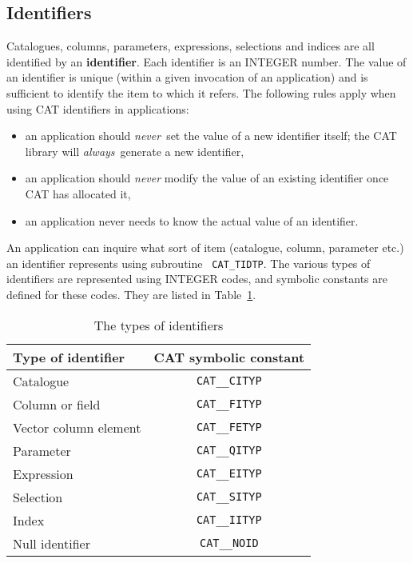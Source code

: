 \subsection{Identifiers}

Catalogues, columns, parameters, expressions, selections and indices are
all identified by an {\bf identifier}. Each identifier is an INTEGER
number. The value of an identifier is unique (within a given invocation of
an application) and is sufficient to identify the item to which it refers.
The following rules apply when using CAT identifiers in applications:

\begin{itemize}

  \item an application should {\it never}\, set the value of a new
   identifier itself; the CAT library will {\it always}\, generate a
   new identifier,

  \item an application should {\it never} modify the value of an
   existing identifier once CAT has allocated it,

  \item an application never needs to know the actual value of an
   identifier.

\end{itemize}

An application can inquire what sort of item (catalogue, column,
parameter etc.) an identifier represents using subroutine {\tt
CAT\_TIDTP}. The various types of identifiers are represented using
INTEGER codes, and symbolic constants are defined for these codes. They
are listed in Table~\ref{IDTYPE}.

\begin{table}[htbp]

\begin{center}
\begin{tabular}{lc}
Type of identifier        &  CAT symbolic constant \\ \hline
Catalogue                 &  {\tt CAT\_\_CITYP}   \\
Column or field           &  {\tt CAT\_\_FITYP}   \\
Vector column element     &  {\tt CAT\_\_FETYP}   \\
Parameter                 &  {\tt CAT\_\_QITYP}   \\
Expression                &  {\tt CAT\_\_EITYP}   \\
Selection                 &  {\tt CAT\_\_SITYP}   \\
Index                     &  {\tt CAT\_\_IITYP}   \\
Null identifier           &  {\tt CAT\_\_NOID}   \\
\end{tabular}
\end{center}

\caption{\label{IDTYPE}The types of identifiers}

\end{table}

